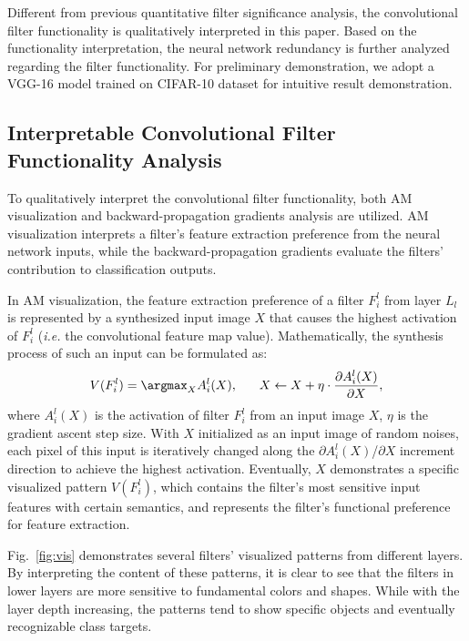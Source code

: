 \documentclass{article} %
\begin{document}
Different from previous quantitative filter significance analysis, the convolutional filter functionality is qualitatively interpreted in this paper.
	Based on the functionality interpretation, the neural network redundancy is further analyzed regarding the filter functionality.
	For preliminary demonstration, we adopt a VGG-16 model trained on CIFAR-10 dataset for intuitive result demonstration.

\subsection{Interpretable Convolutional Filter Functionality Analysis}%
To qualitatively interpret the convolutional filter functionality, both AM visualization and backward-propagation gradients analysis are utilized.
AM visualization interprets a filter's feature extraction preference from the neural network inputs, while the backward-propagation gradients evaluate the filters' contribution to classification outputs.

In AM visualization, the feature extraction preference of a filter $F_i^l$ from layer $L_l$ is represented by a synthesized input image $X$ that causes the highest activation of $F_i^l$ (\textit{i.e.} the convolutional feature map value).
	Mathematically, the synthesis process of such an input can be formulated as:
\begin{equation}
	V(F^l_i)=\argmax_{X} {A^l_i(X),
	\hspace{0.6cm} X \leftarrow X} + \eta \cdot \frac{\partial A^l_i(X)}{ \partial X},
	\label{eq:am}
\end{equation}
where $A^l_i(X)$ is the activation of filter $F_i^l$ from an input image $X$, $\eta$ is the gradient ascent step size.
	With $X$ initialized as an input image of random noises, each pixel of this input is iteratively changed along the $\partial A^l_i(X)$/$\partial X$ increment direction to achieve the highest activation.
	Eventually, $X$ demonstrates a specific visualized pattern $V(F^l_i)$, which contains the filter's most sensitive input features with certain semantics, and represents the filter's functional preference for feature extraction.

Fig.~\ref{fig:vis} demonstrates several filters' visualized patterns from different layers.
	By interpreting the content of these patterns, it is clear to see that the filters in lower layers are more sensitive to fundamental colors and shapes.
	While with the layer depth increasing, the patterns tend to show specific objects and eventually recognizable class targets.
\end{document}

